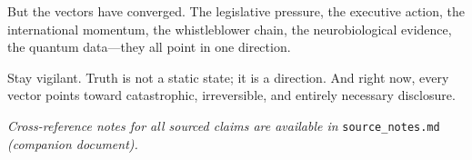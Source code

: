 \documentclass[11pt,a4paper]{article}
\begin{document}
But the vectors have converged. The legislative pressure, the executive action, the international momentum, the whistleblower chain, the neurobiological evidence, the quantum data---they all point in one direction.

Stay vigilant. Truth is not a static state; it is a direction. And right now, every vector points toward catastrophic, irreversible, and entirely necessary disclosure.

\vspace{1cm}
\noindent\textit{Cross-reference notes for all sourced claims are available in} \texttt{source\_notes.md} \textit{(companion document).}
\end{document}
